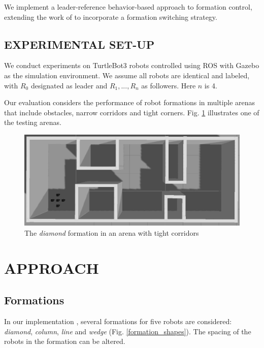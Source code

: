 \documentclass[letterpaper, 10 pt, conference]{ieeeconf}  %
\begin{document}
We implement a leader-reference behavior-based approach to formation control, extending the work of \cite{c2} to incorporate a formation switching strategy.

\subsection{EXPERIMENTAL SET-UP}

We conduct experiments on TurtleBot3 \cite{turtlebot} robots controlled using ROS \cite{ros} with Gazebo \cite{gazebo} as the simulation environment. We assume all robots are identical and labeled, with $R_0$ designated as leader and $R_1,...,R_n$ as followers. Here $n$ is 4.

Our evaluation considers the performance of robot formations in multiple arenas that include obstacles, narrow corridors and tight corners. Fig. \ref{corridorworld} illustrates one of the testing arenas.

\begin{figure}[thpb]
\centering
\includegraphics[width=\linewidth]{images/corridorworld.png}
\caption{The \textit{diamond} formation in an arena with tight corridors}
\label{corridorworld}
\end{figure}

\section{APPROACH}

\subsection{Formations}

In our implementation \cite{repository}, several formations for five robots are considered: \textit{diamond}, \textit{column}, \textit{line} and \textit{wedge} (Fig. \ref{formation_shapes}). The spacing of the robots in the formation can be altered. 
   
\end{document}
